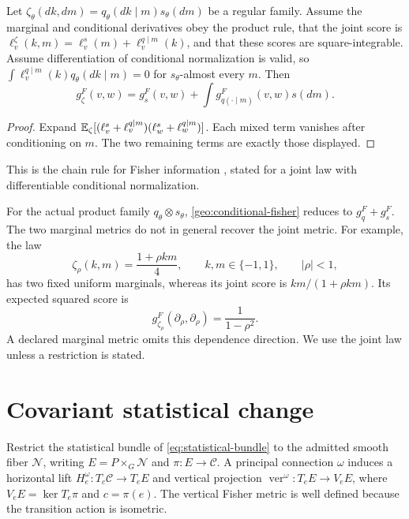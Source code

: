 Let $\zeta_\theta(dk,dm)=q_\theta(dk\mid m)s_\theta(dm)$ be a regular family. Assume the marginal and conditional derivatives obey the product rule, that the joint score is
$\ell^\zeta_v(k,m)=\ell^s_v(m)+\ell^{q\mid m}_v(k)$, and that these scores are square-integrable. Assume differentiation of conditional normalization is valid, so
$\int\ell^{q\mid m}_v(k)q_\theta(dk\mid m)=0$ for $s_\theta$-almost every $m$. Then
\begin{equation}
g^F_\zeta(v,w)
=g^F_s(v,w)
+\int g^F_{q(\cdot\mid m)}(v,w)s(dm).
\label{geo:conditional-fisher}
\end{equation}
\begin{proof}
Expand $\mathbb E_\zeta[(\ell^s_v+\ell^{q\mid m}_v)(\ell^s_w+\ell^{q\mid m}_w)]$. Each mixed term vanishes after conditioning on $m$. The two remaining terms are exactly those displayed.
\end{proof}
This is the chain rule for Fisher information \citep{Zamir1998}, stated for a joint law with differentiable conditional normalization.

For the actual product family $q_\theta\otimes s_\theta$, \cref{geo:conditional-fisher} reduces to $g^F_q+g^F_s$. The two marginal metrics do not in general recover the joint metric. For example, the law
\begin{equation}
\zeta_\rho(k,m)=\frac{1+\rho km}{4},
\qquad k,m\in\{-1,1\},\qquad |\rho|<1,
\end{equation}
has two fixed uniform marginals, whereas its joint score is $km/(1+\rho km)$. Its expected squared score is
\begin{equation}
g^F_{\zeta_\rho}(\partial_\rho,\partial_\rho)=\frac{1}{1-\rho^2}.
\end{equation}
A declared marginal metric omits this dependence direction. We use the joint law unless a restriction is stated.

\section{Covariant statistical change}

Restrict the statistical bundle of \cref{eq:statistical-bundle} to the admitted smooth fiber $\mathcal N$, writing $E=P\times_G\mathcal N$ and $\pi:E\to\mathcal C$. A principal connection $\omega$ induces a horizontal lift $H^\omega_e:T_c\mathcal C\to T_eE$ and vertical projection $\operatorname{ver}^\omega:T_eE\to V_eE$, where $V_eE=\ker T_e\pi$ and $c=\pi(e)$. The vertical Fisher metric is well defined because the transition action is isometric.

